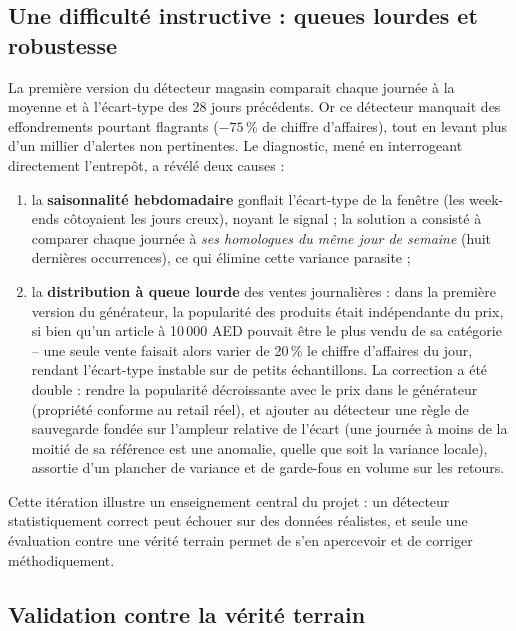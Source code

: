 \documentclass[12pt,a4paper]{report}
\begin{document}
\subsection{Une difficulté instructive : queues lourdes et robustesse}

La première version du détecteur magasin comparait chaque journée à la moyenne
et à l'écart-type des 28 jours précédents. Or ce détecteur manquait des
effondrements pourtant flagrants ($-75\,\%$ de chiffre d'affaires), tout en
levant plus d'un millier d'alertes non pertinentes. Le diagnostic, mené en
interrogeant directement l'entrepôt, a révélé deux causes :

\begin{enumerate}
  \item la \textbf{saisonnalité hebdomadaire} gonflait l'écart-type de la
    fenêtre (les week-ends côtoyaient les jours creux), noyant le signal ;
    la solution a consisté à comparer chaque journée à \emph{ses homologues
    du même jour de semaine} (huit dernières occurrences), ce qui élimine
    cette variance parasite ;
  \item la \textbf{distribution à queue lourde} des ventes journalières :
    dans la première version du générateur, la popularité des produits était
    indépendante du prix, si bien qu'un article à 10\,000 AED pouvait être le
    plus vendu de sa catégorie -- une seule vente faisait alors varier de
    20\,\% le chiffre d'affaires du jour, rendant l'écart-type instable sur
    de petits échantillons. La correction a été double : rendre la
    popularité décroissante avec le prix dans le générateur (propriété
    conforme au retail réel), et ajouter au détecteur une règle de
    sauvegarde fondée sur l'ampleur relative de l'écart (une journée à moins
    de la moitié de sa référence est une anomalie, quelle que soit la
    variance locale), assortie d'un plancher de variance et de garde-fous en
    volume sur les retours.
\end{enumerate}

Cette itération illustre un enseignement central du projet : un détecteur
statistiquement correct peut échouer sur des données réalistes, et seule une
évaluation contre une vérité terrain permet de s'en apercevoir et de corriger
méthodiquement.

\subsection{Validation contre la vérité terrain}
\end{document}
